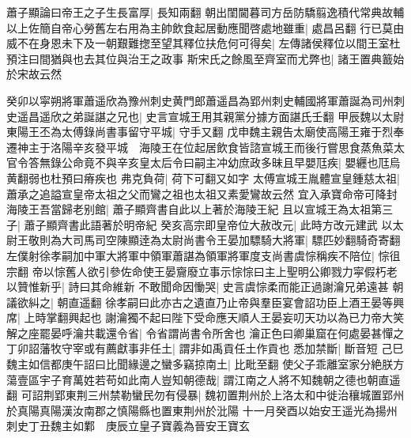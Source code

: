 蕭子顯論曰帝王之子生長富厚|{
	長知兩翻}
朝出閨閫暮司方岳防驕翦逸積代常典故輔以上佐簡自帝心勞舊左右用為主帥飲食起居動應聞啓處地雖重|{
	處昌呂翻}
行已莫由威不在身恩未下及一朝艱難揔至望其釋位扶危何可得矣|{
	左傳諸侯釋位以間王室杜預注曰間猶與也去其位與治王之政事}
斯宋氏之餘風至齊室而尤弊也|{
	諸王置典籖始於宋故云然}


癸卯以寜朔將軍蕭遥欣為豫州刺史黄門郎蕭遥昌為郢州刺史輔國將軍蕭誕為司州刺史遥昌遥欣之弟誕諶之兄也|{
	史言宣城王用其親黨分據方面諶氏壬翻}
甲辰魏以太尉東陽王丕為太傅錄尚書事留守平城|{
	守手又翻}
戊申魏主親告太廟使高陽王雍于烈奉遷神主于洛陽辛亥發平城　海陵王在位起居飲食皆諮宣城王而後行嘗思食蒸魚菜太官令答無錄公命竟不與辛亥皇太后令曰嗣主冲幼庶政多昧且早嬰尫疾|{
	嬰纒也尫烏黄翻弱也杜預曰瘠疾也}
弗克負荷|{
	荷下可翻又如字}
太傅宣城王胤體宣皇鍾慈太祖|{
	蕭承之追謚宣皇帝太祖之父而鸞之祖也太祖又素愛鸞故云然}
宜入承寶命帝可降封海陵王吾當歸老别館|{
	蕭子顯齊書自此以上著於海陵王紀}
且以宣城王為太祖第三子|{
	蕭子顯齊書此語著於明帝紀}
癸亥高宗即皇帝位大赦改元|{
	此時方改元建武}
以太尉王敬則為大司馬司空陳顯逹為太尉尚書令王晏加驃騎大將軍|{
	驃匹妙翻騎奇寄翻}
左僕射徐孝嗣加中軍大將軍中領軍蕭諶為領軍將軍度支尚書虞悰稱疾不陪位|{
	悰徂宗翻}
帝以悰舊人欲引參佐命使王晏齎廢立事示悰悰曰主上聖明公卿戮力寜假朽老以贊惟新乎|{
	詩曰其命維新}
不敢聞命因慟哭|{
	史言虞悰柔而能正過謝瀹兄弟遠甚}
朝議欲糾之|{
	朝直遥翻}
徐孝嗣曰此亦古之遺直乃止帝與羣臣宴會詔功臣上酒王晏等興席|{
	上時掌翻興起也}
謝瀹獨不起曰陛下受命應天順人王晏妄叨天功以為已力帝大笑解之座罷晏呼瀹共載還令省|{
	令省謂尚書令所舍也}
瀹正色曰卿巢窟在何處晏甚憚之　丁卯詔藩牧守宰或有薦獻事非任土|{
	謂非如禹貢任土作貢也}
悉加禁斷|{
	斷音短}
己巳魏主如信都庚午詔曰比聞緣邊之蠻多竊掠南土|{
	比毗至翻}
使父子乖離室家分絶朕方蕩壹區宇子育萬姓若苟如此南人豈知朝德哉|{
	謂江南之人將不知魏朝之德也朝直遥翻}
可詔荆郢東荆三州禁勒蠻民勿有侵暴|{
	魏初置荆州於上洛太和中徙治穰城置郢州於真陽真陽漢汝南郡之慎陽縣也置東荆州於沘陽}
十一月癸酉以始安王遥光為揚州刺史丁丑魏主如鄴　庚辰立皇子寶義為晉安王寶玄


